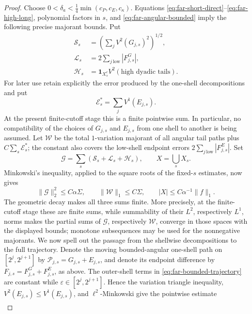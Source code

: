 \documentclass[11pt]{article}
\numberwithin{equation}{section}
\theoremstyle{remark}
\theoremstyle{definition}
\newcommand{\norm}[1]{\lVert #1\rVert}
\begin{document}
\begin{proof}
Choose
$0<\delta_a<\frac14\min(c_P,c_E,c_\kappa)$.  Equations
\eqref{eq:far-short-direct}--\eqref{eq:far-high-long}, polynomial factors
in $s$, and \eqref{eq:far-angular-bounded} imply the following precise
majorant bounds.  Put
\begin{align*}
 \mathcal S_s&=\left(\sum_jV^2(G_{j,s})^2\right)^{1/2},\\
 \mathcal L_s&=2\sum_{j\ \mathrm{low}}|F^G_{j,s}|,\\
 \mathcal H_s&=\mathbf1_{X_s^c}
 V^2(\text{high dyadic tails}).
\end{align*}
For later use retain explicitly the error produced by the one-shell
decompositions and put
\begin{equation}\label{eq:far-shell-error-majorant}
 \mathcal E_s^*=\sum_jV^1(E_{j,s}).
\end{equation}
At the present finite-cutoff stage this is a finite pointwise sum.  In
particular, no compatibility of the choices of \(G_{j,s}\) and \(E_{j,s}\)
from one shell to another is being assumed.  Let \(\mathcal W\) be the
total \(1\)-variation majorant of all angular
tail paths plus
$C\sum_s\mathcal E_s^*$; the constant also covers the low-shell
endpoint errors $2\sum_{j\,\mathrm{low}}|F^E_{j,s}|$.  Set
\[
 \mathcal G=\sum_s(\mathcal S_s+\mathcal L_s+\mathcal H_s),
 \qquad X=\bigcup_sX_s.
\]
Minkowski's inequality, applied to the square roots of the fixed-$s$
estimates, now gives
\begin{equation}\label{eq:far-global-GW}
 \norm{\mathcal G}_2^2\le C\alpha\Sigma,
 \qquad \norm{\mathcal W}_1\le C\Sigma,
 \qquad |X|
 \le C\alpha^{-1}\norm f_1.
\end{equation}
The geometric decay makes all three sums finite.  More precisely, at the
finite-cutoff stage these are finite sums, while summability of their
$L^2$, respectively $L^1$, norms makes the partial sums of $\mathcal G$,
respectively $\mathcal W$, converge in those spaces with the displayed
bounds; monotone subsequences may be used for the nonnegative majorants.
We now spell out the passage from the shellwise decompositions to the full
trajectory.  Denote the moving bounded-angular one-shell path on
\([2^j,2^{j+1}]\) by \(\mathcal P_{j,s}=G_{j,s}+E_{j,s}\), and denote its
endpoint difference by \(F_{j,s}=F^G_{j,s}+F^E_{j,s}\), as above.  The
outer-shell terms in \eqref{eq:far-bounded-trajectory} are constant while
\(\varepsilon\in[2^j,2^{j+1}]\).  Hence the variation triangle inequality,
\(V^2(E_{j,s})\le V^1(E_{j,s})\), and \(\ell^2\)-Minkowski give the
pointwise estimate
\begin{align}

\end{align}
\end{proof}
\end{document}
